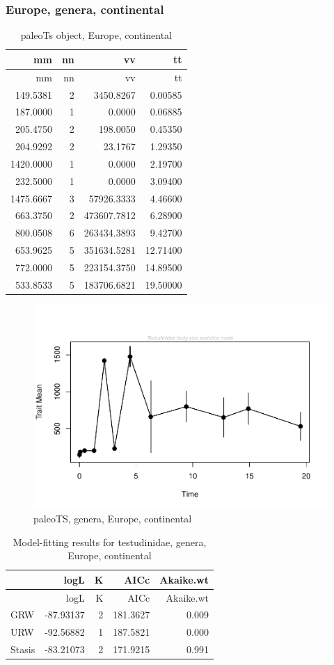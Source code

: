 \subsubsection{Europe, genera, continental}\label{europe-genera-continental}

\begin{longtable}[]{@{}rrrr@{}}
	\caption{paleoTs object, Europe, continental}
	\label{tab:pTSEuC}\tabularnewline
	\toprule
	mm & nn & vv & tt\tabularnewline
	\midrule
	\endfirsthead
	\toprule
	mm & nn & vv & tt\tabularnewline
	\midrule
	\endhead
	149.5381 & 2 & 3450.8267 & 0.00585\tabularnewline
	187.0000 & 1 & 0.0000 & 0.06885\tabularnewline
	205.4750 & 2 & 198.0050 & 0.45350\tabularnewline
	204.9292 & 2 & 23.1767 & 1.29350\tabularnewline
	1420.0000 & 1 & 0.0000 & 2.19700\tabularnewline
	232.5000 & 1 & 0.0000 & 3.09400\tabularnewline
	1475.6667 & 3 & 57926.3333 & 4.46600\tabularnewline
	663.3750 & 2 & 473607.7812 & 6.28900\tabularnewline
	800.0508 & 6 & 263434.3893 & 9.42700\tabularnewline
	653.9625 & 5 & 351634.5281 & 12.71400\tabularnewline
	772.0000 & 5 & 223154.3750 & 14.89500\tabularnewline
	533.8533 & 5 & 183706.6821 & 19.50000\tabularnewline
	\bottomrule
\end{longtable}

\begin{figure}[H]
	\centering
	\includegraphics{MA_JJ_files/figure-latex/pTSEuC-1.pdf}
	\caption{paleoTS, genera, Europe, continental}
	\label{fig:pTSEuC}
\end{figure}

\begin{longtable}[]{@{}lrrrr@{}}
	\caption{Model-fitting results for testudinidae, genera, Europe,
		continental}
	\label{tab:pTSEuCEM}\tabularnewline
	\toprule
	& logL & K & AICc & Akaike.wt\tabularnewline
	\midrule
	\endfirsthead
	\toprule
	& logL & K & AICc & Akaike.wt\tabularnewline
	\midrule
	\endhead
	GRW & -87.93137 & 2 & 181.3627 & 0.009\tabularnewline
	URW & -92.56882 & 1 & 187.5821 & 0.000\tabularnewline
	Stasis & -83.21073 & 2 & 171.9215 & 0.991\tabularnewline
	\bottomrule
\end{longtable}


